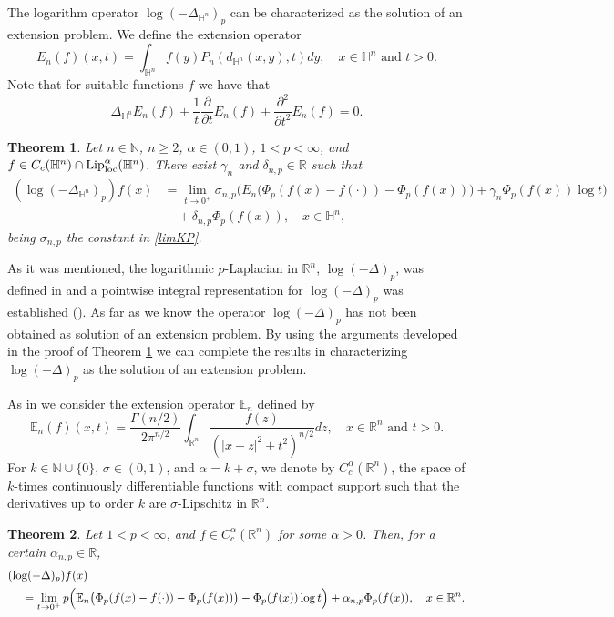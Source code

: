\documentclass[a4paper,10pt, reqno]{amsart}
\newtheorem{thm}{Theorem}[section]
\theoremstyle{definition}
\theoremstyle{remark}
\numberwithin{equation}{section}
\begin{document}
{The logarithm operator $\log(-\Delta_{\mathbb H^n})_p$ can be characterized as the solution of an extension pro\-blem. We define the extension operator
$$
E_n(f)(x,t)=\int_{\mathbb H^n}f(y)P_n(d_{\mathbb H^n}(x,y),t)dy,\quad x\in \mathbb H^n\mbox{ and }t>0.
$$
Note that for suitable functions $f$ we have that
$$
\Delta_{\mathbb H^n}E_n(f)+\frac{1}{t}\frac{\partial}{\partial t}E_n(f)+\frac{\partial ^2}{\partial t^2}E_n(f)=0.
$$
\begin{thm}\label{Th1.3}
Let $n\in \mathbb N$, $n\geq 2$, $\alpha \in (0,1)$, $1<p<\infty$, and $f\in C_c(\mathbb H^n)\cap {\rm Lip}^\alpha _{\rm loc}(\mathbb H^n)$. There exist $\gamma_n$ and $\delta_{n,p}\in \mathbb R$ such that
\begin{align*}
(\log(-\Delta_{\mathbb H^n})_p)f(x)&=\lim_{t\rightarrow 0^+}\sigma_{n,p}\Big(E_n\big(\Phi _p(f(x)-f(\cdot))-\Phi_p(f(x))\big)+\gamma_n\Phi _p(f(x))\log t\Big)\\
&\quad +\delta_{n,p}\Phi _p(f(x)),\quad x\in \mathbb H^n,
\end{align*}
being $\sigma_{n,p}$ the constant in \eqref{limKP}.
\end{thm}

As it was mentioned, the logarithmic $p$-Laplacian in $\mathbb R^n$, $\log(-\Delta)_p$, was defined in \cite{DJF} and a pointwise integral representation for $\log (-\Delta)_p$ was established (\cite[Theorem 1.1]{DJF}). As far as we know the operator $\log(-\Delta )_p$ has not been obtained as solution of an extension problem. By using the arguments developed in the proof of Theorem \ref{Th1.3} we can complete the results in \cite{DJF} characterizing $\log (-\Delta)_p$ as the solution of an extension problem.

As in \cite[Theorem 1.2]{CHW} we consider the extension operator $\mathbb E_n$ defined by
$$
\mathbb E_n(f)(x,t)=\frac{\Gamma (n/2)}{2\pi ^{n/2}}\int_{\mathbb R^n}\frac{f(z)}{(|x-z|^2+t^2)^{n/2}}dz,\quad x\in \mathbb R^n\mbox{ and }t>0.
$$
For $k\in \mathbb N\cup\{0\}$, $\sigma \in (0,1)$, and $\alpha =k+\sigma$, we denote by $C_c^\alpha(\mathbb R^n)$, the space of $k$-times continuously differentiable functions with compact support such that the derivatives up to order $k$ are $\sigma$-Lipschitz in $\mathbb R^n$.
\begin{thm}\label{Th1.4}
    Let $1<p<\infty$, and $f\in C_c^\alpha (\mathbb R^n)$ for some $\alpha >0$. Then, for a certain $\alpha_{n,p}\in \mathbb R$,
    \begin{align*}
    (\log (-\Delta)_p)f(x)&\\
    &\hspace{-2cm}=\lim_{t\rightarrow 0^+}p\Big(\mathbb E_n\big(\Phi _p(f(x)-f(\cdot ))-\Phi_p(f(x))\big)-\Phi _p(f(x))\log t\Big)+\alpha_{n,p}\Phi _p(f(x)),\quad x\in \mathbb R^n.
    \end{align*}
\end{thm}

}
\end{document}
